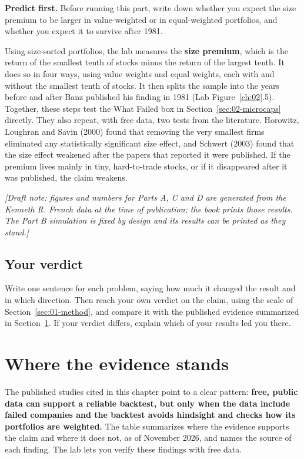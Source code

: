 \textbf{Predict first.} Before running this part, write down whether you expect the size premium to be larger in value-weighted or in equal-weighted portfolios, and whether you expect it to survive after 1981.

Using size-sorted portfolios, the lab measures the \textbf{size premium}, which is the return of the smallest tenth of stocks minus the return of the largest tenth. It does so in four ways, using value weights and equal weights, each with and without the smallest tenth of stocks. It then splits the sample into the years before and after Banz published his finding in 1981 (Lab Figure~\ref{ch:02}.5). Together, these steps test the What Failed box in Section~\ref{sec:02-microcaps} directly. They also repeat, with free data, two tests from the literature. Horowitz, Loughran and Savin (2000) found that removing the very smallest firms eliminated any statistically significant size effect, and Schwert (2003) found that the size effect weakened after the papers that reported it were published. If the premium lives mainly in tiny, hard-to-trade stocks, or if it disappeared after it was published, the claim weakens.

\emph{[Draft note: figures and numbers for Parts A, C and D are generated from the Kenneth R. French data at the time of publication; the book prints those results. The Part B simulation is fixed by design and its results can be printed as they stand.]}

\subsection*{Your verdict}

Write one sentence for each problem, saying how much it changed the result and in which direction. Then reach your own verdict on the claim, using the scale of Section~\ref{sec:01-method}, and compare it with the published evidence summarized in Section~\ref{sec:02-verdict}. If your verdict differs, explain which of your results led you there.

\section{Where the evidence stands}
\label{sec:02-verdict}

The published studies cited in this chapter point to a clear pattern: \textbf{free, public data can support a reliable backtest, but only when the data include failed companies and the backtest avoids hindsight and checks how its portfolios are weighted.} The table summarizes where the evidence supports the claim and where it does not, as of November 2026, and names the source of each finding. The lab lets you verify these findings with free data.

